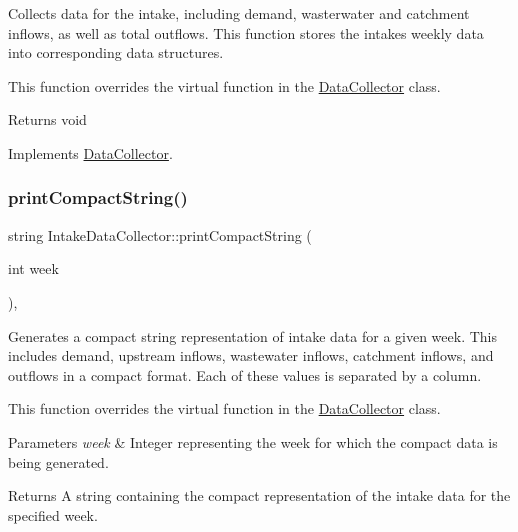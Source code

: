 Collects data for the intake, including demand, wasterwater and catchment inflows, as well as total outflows. This function stores the intake\textquotesingle{}s weekly data into corresponding data structures. 

This function overrides the virtual function in the \mbox{\hyperlink{classDataCollector}{Data\+Collector}} class.

\begin{DoxyReturn}{Returns}
void 
\end{DoxyReturn}


Implements \mbox{\hyperlink{classDataCollector_a01486bf58acbe37b203f97b3b9a79c40}{Data\+Collector}}.

\mbox{\label{classIntakeDataCollector_ac39a40726fd4fe887425b24a10f04034}} 
\subsubsection{\texorpdfstring{print\+Compact\+String()}{printCompactString()}}
{\footnotesize\ttfamily string Intake\+Data\+Collector\+::print\+Compact\+String (\begin{DoxyParamCaption}\item[{int}]{week }\end{DoxyParamCaption})\hspace{0.3cm}{\ttfamily [override]}, {\ttfamily [virtual]}}



Generates a compact string representation of intake data for a given week. This includes demand, upstream inflows, wastewater inflows, catchment inflows, and outflows in a compact format. Each of these values is separated by a column. 

This function overrides the virtual function in the \mbox{\hyperlink{classDataCollector}{Data\+Collector}} class.


\begin{DoxyParams}{Parameters}
{\em week} & Integer representing the week for which the compact data is being generated.\\
\hline
\end{DoxyParams}
\begin{DoxyReturn}{Returns}
A string containing the compact representation of the intake data for the specified week. 
\end{DoxyReturn}


